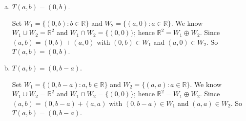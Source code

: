 \begin{Exercise}
	\begin{enumerate}[(a)]
		\item
		\begin{answer}
			$T(a,b) = (0,b)$.
		\end{answer}
		\begin{solution}
			Set $W_1 = \{(0,b):b\in\mathbb{R}\}$ and $W_2 = \{(a,0):a\in\mathbb{R}\}$. We know $W_1\cup W_2 = \mathbb{R}^2$ and $W_1\cap W_2 = \{(0,0)\}$; hence $\mathbb{R}^2 = W_1\oplus W_2$. Since $(a,b) = (0,b) + (a,0)$ with $(0,b)\in W_1$ and $(a,0)\in W_2$. So $T(a,b) = (0,b)$.
		\end{solution}
		
		\item
		\begin{answer}
			$T(a,b) = (0,b-a)$.
		\end{answer}
		\begin{solution}
			Set $W_1 = \{(0,b-a):a,b\in\mathbb{R}\}$ and $W_2 = \{(a,a):a\in\mathbb{R}\}$. We know $W_1\cup W_2 = \mathbb{R}^2$ and $W_1\cap W_2 = \{(0,0)\}$; hence $\mathbb{R}^2 = W_1\oplus W_2$. Since $(a,b) = (0,b-a) + (a,a)$ with $(0,b-a)\in W_1$ and $(a,a)\in W_2$. So $T(a,b) = (0,b-a)$.
		\end{solution}
	\end{enumerate}
\end{Exercise}